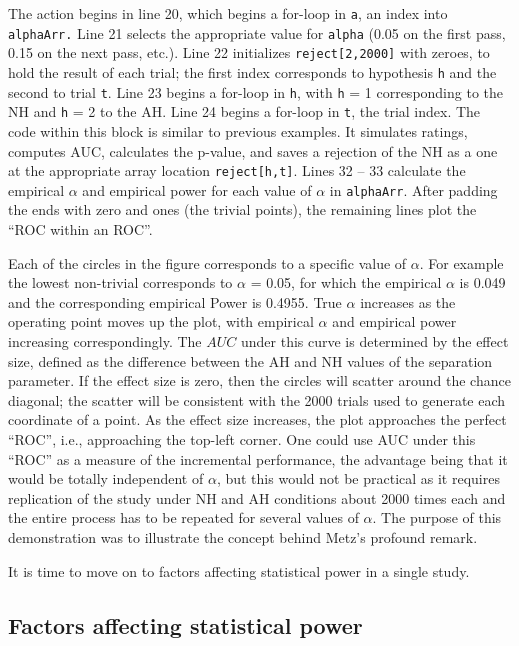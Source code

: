 \documentclass[
]{book}
\begin{document}
The action begins in line 20, which begins a for-loop in \texttt{a}, an index into \texttt{alphaArr.} Line 21 selects the appropriate value for \texttt{alpha} (0.05 on the first pass, 0.15 on the next pass, etc.). Line 22 initializes \texttt{reject{[}2,2000{]}} with zeroes, to hold the result of each trial; the first index corresponds to hypothesis \texttt{h} and the second to trial \texttt{t}. Line 23 begins a for-loop in \texttt{h}, with \texttt{h} = 1 corresponding to the NH and \texttt{h} = 2 to the AH. Line 24 begins a for-loop in \texttt{t}, the trial index. The code within this block is similar to previous examples. It simulates ratings, computes AUC, calculates the p-value, and saves a rejection of the NH as a one at the appropriate array location \texttt{reject{[}h,t{]}}. Lines 32 -- 33 calculate the empirical \(\alpha\) and empirical power for each value of \(\alpha\) in \texttt{alphaArr}. After padding the ends with zero and ones (the trivial points), the remaining lines plot the ``ROC within an ROC''.

Each of the circles in the figure corresponds to a specific value of \(\alpha\). For example the lowest non-trivial corresponds to \(\alpha\) = 0.05, for which the empirical \(\alpha\) is 0.049 and the corresponding empirical Power is 0.4955. True \(\alpha\) increases as the operating point moves up the plot, with empirical \(\alpha\) and empirical power increasing correspondingly. The \(AUC\) under this curve is determined by the effect size, defined as the difference between the AH and NH values of the separation parameter. If the effect size is zero, then the circles will scatter around the chance diagonal; the scatter will be consistent with the 2000 trials used to generate each coordinate of a point. As the effect size increases, the plot approaches the perfect ``ROC'', i.e., approaching the top-left corner. One could use AUC under this ``ROC'' as a measure of the incremental performance, the advantage being that it would be totally independent of \(\alpha\), but this would not be practical as it requires replication of the study under NH and AH conditions about 2000 times each and the entire process has to be repeated for several values of \(\alpha\). The purpose of this demonstration was to illustrate the concept behind Metz's profound remark.

It is time to move on to factors affecting statistical power in a single study.

\hypertarget{factors-affecting-statistical-power}{%
\subsection{Factors affecting statistical power}\label{factors-affecting-statistical-power}}
\end{document}
